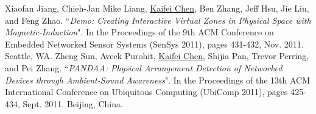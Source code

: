\documentclass[a4paper, 12pt]{article}
\begin{document}
\vfill
\begin{thebibliography}{9}

 Xiaofan Jiang, Chieh-Jan Mike Liang, \underline{Kaifei Chen}, Ben Zhang, Jeff Hsu, Jie Liu, and Feng Zhao. ``\emph{Demo: Creating Interactive Virtual Zones in Physical Space with Magnetic-Induction}". In the Proceedings of the 9th ACM Conference on Embedded Networked Sensor Systems (SenSys 2011), pages 431-432, Nov. 2011. Seattle, WA.
 Zheng Sun, Aveek Purohit, \underline{Kaifei Chen}, Shijia Pan, Trevor Perring, and Pei Zhang. ``\emph{PANDAA: Physical Arrangement Detection of Networked Devices through Ambient-Sound Awareness}". In the Proceedings of the 13th ACM International Conference on Ubiquitous Computing (UbiComp 2011), pages 425-434, Sept. 2011. Beijing, China.
\end{thebibliography}
\end{document}
